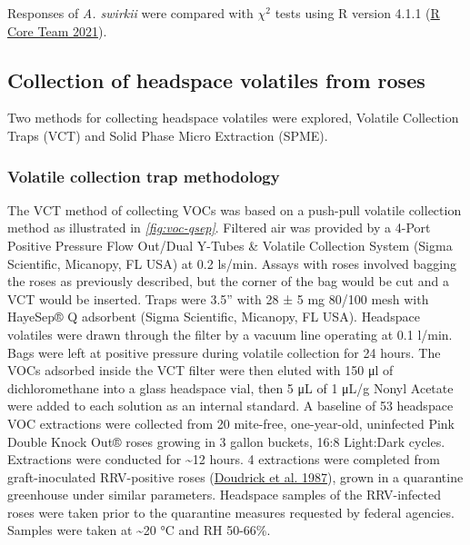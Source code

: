 \documentclass{ufdissertation}[overrideChapters] %
\begin{document}
{Responses of \emph{A. swirkii} were compared with \(\chi^2\) tests using R version 4.1.1 (\protect\hyperlink{ref-RCT2021}{R Core Team 2021}).

\hypertarget{voc-collect}{%
\subsection{Collection of headspace volatiles from roses}\label{voc-collect}}

Two methods for collecting headspace volatiles were explored, Volatile Collection Traps (VCT) and Solid Phase Micro Extraction (SPME).

\hypertarget{volatile-collection-trap-methodology}{%
\subsubsection{Volatile collection trap methodology}\label{volatile-collection-trap-methodology}}

The VCT method of collecting VOCs was based on a push-pull volatile collection method as illustrated in \emph{\ref{fig:voc-qsep}}. Filtered air was provided by a 4-Port Positive Pressure Flow Out/Dual Y-Tubes \& Volatile Collection System (Sigma Scientific, Micanopy, FL USA) at 0.2 \si{\litre}s/min. Assays with roses involved bagging the roses as previously described, but the corner of the bag would be cut and a VCT would be inserted. Traps were 3.5'' with 28 ± 5 \si{\milli\gram} 80/100 mesh with HayeSep® Q adsorbent (Sigma Scientific, Micanopy, FL USA). Headspace volatiles were drawn through the filter by a vacuum line operating at 0.1 \si{\litre}/min. Bags were left at positive pressure during volatile collection for 24 hours. The VOCs adsorbed inside the VCT filter were then eluted with 150 \si{\micro\litre} of dichloromethane into a glass headspace vial, then 5 \si{\micro\liter} of 1 \si{\micro\liter}/\si{\gram} Nonyl Acetate were added to each solution as an internal standard. A baseline of 53 headspace VOC extractions were collected from 20 mite-free, one-year-old, uninfected Pink Double Knock Out® roses growing in 3 gallon buckets, 16:8 Light:Dark cycles. Extractions were conducted for \textasciitilde12 hours. 4 extractions were completed from graft-inoculated RRV-positive roses (\protect\hyperlink{ref-Doudrick1987}{Doudrick et al. 1987}), grown in a quarantine greenhouse under similar parameters. Headspace samples of the RRV-infected roses were taken prior to the quarantine measures requested by federal agencies. Samples were taken at \textasciitilde20 °C and RH 50-66\%.

}
\end{document}
